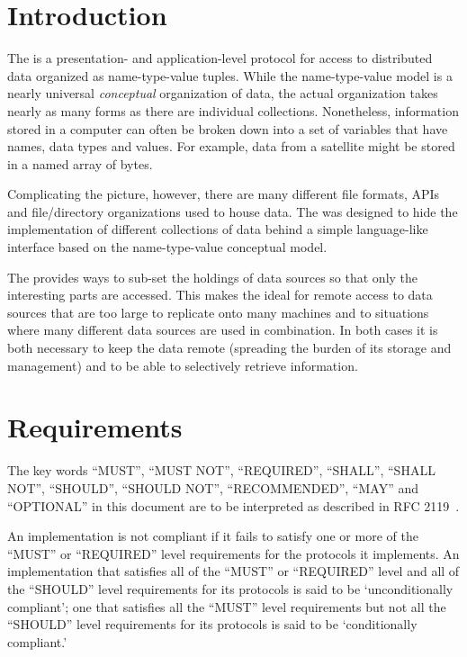\documentclass[justify]{dods-paper}
\begin{document}
\section{Introduction}

The \DAP is a presentation- and application-level protocol
\cite{IEC94} for access to distributed data organized as
name-type-value tuples. While the name-type-value model is a nearly
universal \emph{conceptual} organization of data, the actual
organization takes nearly as many forms as there are individual
collections. Nonetheless, information stored in a computer can often be
broken down into a set of variables that have names, data types and
values.  For example, data from a satellite might be stored in a named
array of bytes.  

Complicating the picture, however, there are many different file
formats, APIs and file/directory organizations used to house data. The
\DAP was designed to hide the implementation of different collections
of data behind a simple language-like interface based on the
name-type-value conceptual model.

The \DAP provides ways to sub-set the holdings of data sources so that
only the interesting parts are accessed. This makes the \DAP ideal for
remote access to data sources that are too large to replicate onto many
machines and to situations where many different data sources are used in
combination. In both cases it is both necessary to keep the data remote
(spreading the burden of its storage and management) and to be able to
selectively retrieve information.

\section{Requirements}

The key words ``MUST'', ``MUST NOT'', ``REQUIRED'', ``SHALL'', ``SHALL NOT'',
``SHOULD'', ``SHOULD NOT'', ``RECOMMENDED'', ``MAY'' and ``OPTIONAL'' in this
document are to be interpreted as described in RFC 2119~\cite{rfc2119}.

An implementation is not compliant if it fails to satisfy one or more of the
``MUST'' or ``REQUIRED'' level requirements for the protocols it implements.
An implementation that satisfies all of the ``MUST'' or ``REQUIRED'' level
and all of the ``SHOULD'' level requirements for its protocols is said to be
`unconditionally compliant'; one that satisfies all the ``MUST'' level
requirements but not all the ``SHOULD'' level requirements for its protocols
is said to be `conditionally compliant.'
\end{document}
